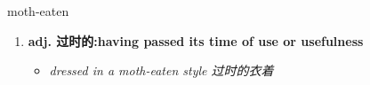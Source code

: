 
\begin{frame}
{\huge moth-eaten}
\begin{center}
\begin{enumerate}\Large
  \item \textbf{adj. 过时的:having passed its time of use or usefulness}
  \begin{itemize}
    \item \em{\Large{dressed in a moth-eaten style 过时的衣着}}
  \end{itemize}
\end{enumerate}
\end{center}
\end{frame}
